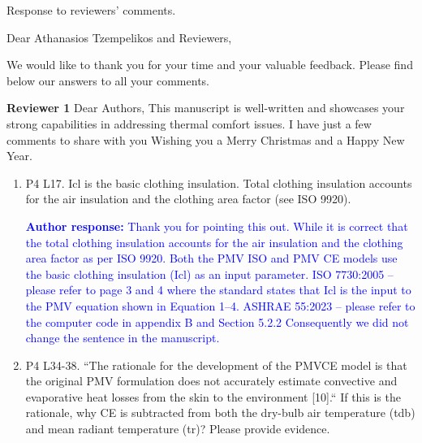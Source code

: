 \documentclass[a4paper, 10pt]{letter}
\newcommand{\response}[1]{\textcolor{blue}{\textbf{Author response:} #1}}
\begin{document}
    \begin{letter}
    {
        Response to reviewers' comments.
    }

        \opening{Dear Athanasios Tzempelikos and Reviewers,}


        We would like to thank you for your time and your valuable feedback.
        Please find below our answers to all your comments.

        \textbf{Reviewer 1}
        Dear Authors,
        This manuscript is well-written and showcases your strong capabilities in addressing thermal comfort issues.
        I have just a few comments to share with you Wishing you a Merry Christmas and a Happy New Year.

        \begin{enumerate}

            \item P4 L17.
            Icl is the basic clothing insulation.
            Total clothing insulation accounts for the air insulation and the clothing area factor (see ISO 9920).

            \response{
                Thank you for pointing this out.
            While it is correct that the total clothing insulation accounts for the air insulation and the clothing area factor as per ISO 9920.
            Both the PMV ISO and PMV CE models use the basic clothing insulation (Icl) as an input parameter.
            ISO 7730:2005 -- please refer to page 3 and 4 where the standard states that Icl is the input to the PMV equation shown in Equation 1--4.
            ASHRAE 55:2023 -- please refer to the computer code in appendix B and Section 5.2.2
            Consequently we did not change the sentence in the manuscript.
            }

            \item P4 L34-38.
            ``The rationale for the development of the PMVCE model is that the original PMV
            formulation does not accurately estimate convective and evaporative heat losses from
            the skin to the environment [10].`` If this is the rationale, why CE is subtracted from both
            the dry-bulb air temperature (tdb) and mean radiant temperature (tr)?
            Please provide evidence.


\end{enumerate}
\end{letter}
\end{document}
